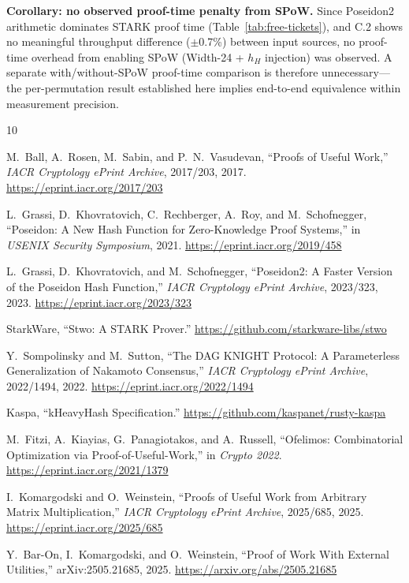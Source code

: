 \documentclass[11pt,a4paper]{article}
\begin{document}
\textbf{Corollary: no observed proof-time penalty from SPoW.}
Since Poseidon2 arithmetic dominates STARK proof time (Table~\ref{tab:free-tickets}), and C.2 shows no meaningful throughput difference ($\pm$0.7\%) between input sources, no proof-time overhead from enabling SPoW (Width-24 + $h_H$ injection) was observed.
A separate with/without-SPoW proof-time comparison is therefore unnecessary---the per-permutation result established here implies end-to-end equivalence within measurement precision.

\begin{thebibliography}{10}

M.~Ball, A.~Rosen, M.~Sabin, and P.~N.~Vasudevan,
``Proofs of Useful Work,''
\emph{IACR Cryptology ePrint Archive}, 2017/203, 2017.
\url{https://eprint.iacr.org/2017/203}

L.~Grassi, D.~Khovratovich, C.~Rechberger, A.~Roy, and M.~Schofnegger,
``Poseidon: A New Hash Function for Zero-Knowledge Proof Systems,''
in \emph{USENIX Security Symposium}, 2021.
\url{https://eprint.iacr.org/2019/458}

L.~Grassi, D.~Khovratovich, and M.~Schofnegger,
``Poseidon2: A Faster Version of the Poseidon Hash Function,''
\emph{IACR Cryptology ePrint Archive}, 2023/323, 2023.
\url{https://eprint.iacr.org/2023/323}

StarkWare,
``Stwo: A STARK Prover.''
\url{https://github.com/starkware-libs/stwo}

Y.~Sompolinsky and M.~Sutton,
``The DAG KNIGHT Protocol: A Parameterless Generalization of Nakamoto Consensus,''
\emph{IACR Cryptology ePrint Archive}, 2022/1494, 2022.
\url{https://eprint.iacr.org/2022/1494}

Kaspa,
``kHeavyHash Specification.''
\url{https://github.com/kaspanet/rusty-kaspa}

M.~Fitzi, A.~Kiayias, G.~Panagiotakos, and A.~Russell,
``Ofelimos: Combinatorial Optimization via Proof-of-Useful-Work,''
in \emph{Crypto 2022}.
\url{https://eprint.iacr.org/2021/1379}

I.~Komargodski and O.~Weinstein,
``Proofs of Useful Work from Arbitrary Matrix Multiplication,''
\emph{IACR Cryptology ePrint Archive}, 2025/685, 2025.
\url{https://eprint.iacr.org/2025/685}

Y.~Bar-On, I.~Komargodski, and O.~Weinstein,
``Proof of Work With External Utilities,''
arXiv:2505.21685, 2025.
\url{https://arxiv.org/abs/2505.21685}


\end{thebibliography}
\end{document}
